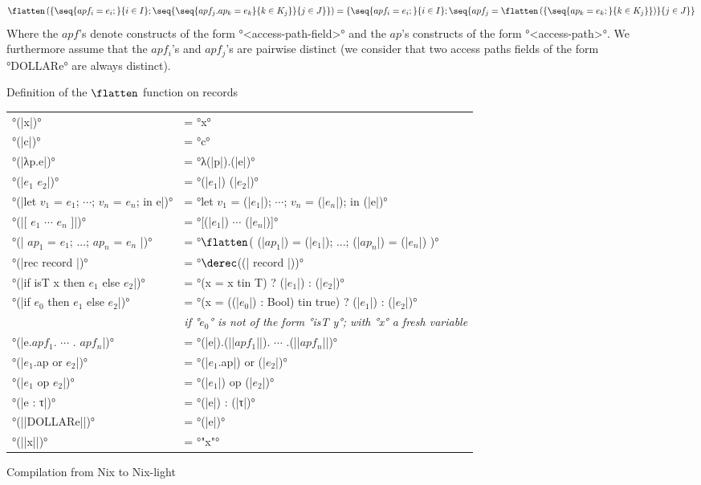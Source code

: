 \begin{figure}[H]
  \begin{displaymath}
    \flatten\left(\left\{ \seq{ apf_i = e_i;}{i \in I};
      \seq{\seq{apf_j.ap_k = e_k}{k \in K_j}}{j \in J} \right\}\right) =
      \left\{ \seq{ apf_i = e_i;}{i \in I}; \seq{ apf_j =
        \flatten\left(\left\{ \seq{ap_k = e_k;}{k \in K_j} \right\}\right)
        }{j \in J} \right\}
    \end{displaymath}
    \center
    Where the $apf$'s denote constructs of the form °<access-path-field>°
    and the $ap$'s constructs of the form °<access-path>°.
    We furthermore assume that the $apf_i$'s and $apf_j$'s are pairwise distinct
    (we consider that two access paths fields of the form °DOLLAR{e}° are always
     distinct).
    \caption{Definition of the $\flatten$ function on records\label{compilation::flatten}}
\end{figure}

\begin{figure}[H]
  \begin{tabular}{ll}
    °(|x|)° &= °x° \\
    °(|c|)° &= °c°\\
    °(|λp.e|)° &= °λ(|p|).(|e|)°\\
    °(|$e_1$ $e_2$|)° &= °(|$e_1$|) (|$e_2$|)°\\
    °(|let $v_1$ = $e_1$; $\cdots$; $v_n$ = $e_n$; in e|)° &=
      °let $v_1$ = (|$e_1$|); $\cdots$; $v_n$ = (|$e_n$|); in (|e|)°\\
    °(|[ $e_1$ $\cdots$ $e_n$ ]|)° &= °[(|$e_1$|) $\cdots$ (|$e_n$|)]°\\
    °(|{ $ap_1$ = $e_1$; ...; $ap_n$ = $e_n$ }|)°
      &= °$\flatten$({ (|$ap_1$|) = (|$e_1$|); ...; (|$ap_n$|) = (|$e_n$|) })°\\
    °(|rec { record }|)° &= °$\derec$((|{ record }|))°\\
    °(|if isT x then $e_1$ else $e_2$|)° &= °(x = x tin T) ? (|$e_1$|) : (|$e_2$|)°\\
    °(|if $e_0$ then $e_1$ else $e_2$|)° &=
      °(x = ((|$e_0$|) : Bool) tin true) ? (|$e_1$|) : (|$e_2$|)°\\
    &{\itshape
      if °$e_0$° is not of the form °isT y°;
      with °x° a fresh variable} \\
    °(|e.$apf_1$. $\cdots$ . $apf_n$|)° &= °(|e|).(||$apf_1$||). $\cdots$ .(||$apf_n$||)°\\
    °(|$e_1$.ap or $e_2$|)° &= °(|$e_1$.ap|) or (|$e_2$|)°\\
    °(|$e_1$ op $e_2$|)° &= °(|$e_1$|) op (|$e_2$|)°\\
    °(|e : τ|)° &= °(|e|) : (|τ|)°\\

    °(||DOLLAR{e}||)° &= °(|e|)°\\
    °(||x||)° &= °"x"°
  \end{tabular}
  \caption{Compilation from Nix to Nix-light}\label{nix-light::compilation}
\end{figure}

